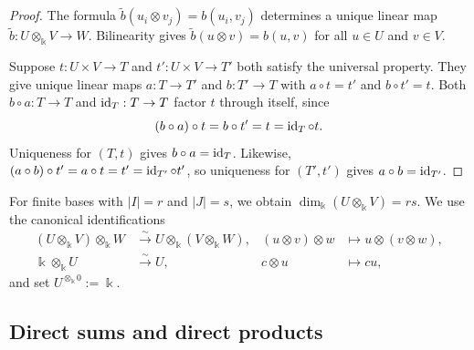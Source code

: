 \begin{supplementary}
\begin{proof}
The formula $\widetilde b(u_i\otimes v_j)=b(u_i,v_j)$ determines a unique linear map $\widetilde b:U\otimes_\Bbbk V\to W$.
Bilinearity gives $\widetilde b(u\otimes v)=b(u,v)$ for all $u\in U$ and $v\in V$.

Suppose $t:U\times V\to T$ and $t':U\times V\to T'$ both satisfy the universal property.
They give unique linear maps $a:T\to T'$ and $b:T'\to T$ with $a\circ t=t'$ and $b\circ t'=t$.
Both $b\circ a:T\to T$ and $\operatorname{id}_T:T\to T$ factor $t$ through itself, since
\[
(b\circ a)\circ t=b\circ t'=t=\operatorname{id}_T\circ t.
\]
Uniqueness for $(T,t)$ gives $b\circ a=\operatorname{id}_T$.
Likewise, $(a\circ b)\circ t'=a\circ t=t'=\operatorname{id}_{T'}\circ t'$, so uniqueness for $(T',t')$ gives $a\circ b=\operatorname{id}_{T'}$.
\end{proof}
\end{supplementary}

For finite bases with $|I|=r$ and $|J|=s$, we obtain $\dim_\Bbbk(U\otimes_\Bbbk V)=rs$.
We use the canonical identifications
\[
\begin{aligned}
(U\otimes_\Bbbk V)\otimes_\Bbbk W&\xrightarrow{\sim}U\otimes_\Bbbk(V\otimes_\Bbbk W),
& (u\otimes v)\otimes w&\longmapsto u\otimes(v\otimes w),\\
\Bbbk\otimes_\Bbbk U&\xrightarrow{\sim}U,
& c\otimes u&\longmapsto cu,
\end{aligned}
\]
and set $U^{\otimes_\Bbbk 0}:=\Bbbk$.


\subsection{Direct sums and direct products}\label{subsec:sums-products}

